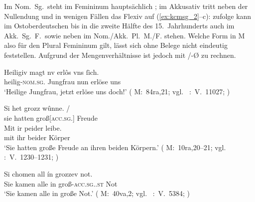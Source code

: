 Im Nom.\ Sg.\ steht im Femininum hauptsächlich  ; im
Akkusativ tritt neben der Nullendung und  in
wenigen Fällen das Flexiv  auf (\ref{ex:kcmsg_2}--c):
\citet[191--192]{reichmannwegera1993} zufolge kann im
Ostoberdeutschen bis in die zweite Hälfte des 15.~Jahrhunderts
 auch im Akk.\ Sg.\ F.\ sowie  neben
 im Nom./Akk.\ Pl.\ M./F. stehen. Welche Form in M also für den Plural
Femininum gilt, lässt sich ohne Belege nicht eindeutig
feststellen. Aufgrund der Mengenverhältnisse ist jedoch mit /-Ø zu
rechnen.

\begin{exe}
\ex \label{ex:kcmsg}
	\begin{xlist}
	\ex \label{ex:kcmsg_1}
		\gll Heiligiv magt nv erlôs {vns ſich}. \\
			heilig-\textsc{nom.sg.\FemF} Jungfrau nun erlöse uns\footnotemark \\
		\trans `Heilige Jungfrau, jetzt erlöse uns doch!'
			(%
				M:~84ra,21; vgl.~%
				\KC:~V.~11027;
				\cite[283]{schroeder1895}%
			)

	\ex \label{ex:kcmsg_2}
		\gll Si het grozz wûnne. {/} \\
			sie hatten groß[\textsc{acc.sg.\FemI}] Freude \\
		\gll Mit ir peider leibe. \\
			mit ihr beider Körper \\
		\trans `Sie hatten große Freude an ihren beiden Körpern.'
			(%
				M:~10ra,20--21; vgl.~%
				\KC:~V.~1230--1231;
				\cite[104]{schroeder1895}%
			)

	\ex \label{ex:kcmsg_3}
		\gll Si chomen all ín grozzev not. \\
			Sie kamen alle in groß-\textsc{acc.sg.\FemI.st} Not \\
		\trans `Sie kamen alle in große Not.'
			(%
				M:~40va,2; vgl.~%
				\KC:~V.~5384;
				\cite[180]{schroeder1895}%
			)
	\end{xlist}
\end{exe}

